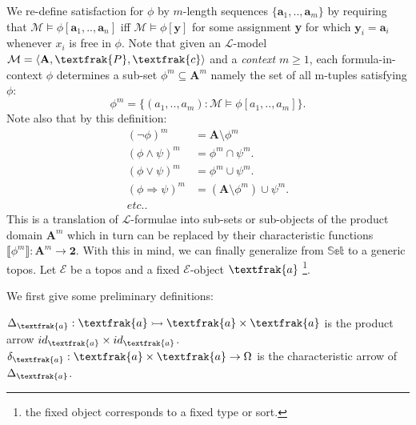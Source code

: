 We re-define satisfaction for $\phi$ by $m$-length sequences $\{ \textbf{a}_1,..,\textbf{a}_m \}$ by requiring that $\mathcal{M} \vDash \phi[\textbf{a}_1,..,\textbf{a}_n]$ iff $\mathcal{M} \vDash \phi[\textbf{y}]$ for some assignment \textbf{y} for which $\textbf{y}_i = \textbf{a}_i$ whenever $x_i$ is free in $\phi$.  \newline
Note that given an $\mathcal{L}$-model $\mathcal{M}= \langle \textbf{A}, \textfrak{P}, \textfrak{c} \rangle$ and a \emph{context} $m \geq 1$, each formula-in-context $\phi$ determines a sub-set $\phi^m \subseteq \textbf{A}^m$ namely the set of all m-tuples satisfying $\phi$:
\begin{equation*}
	\phi^m = \{(a_1,..,a_m) : \mathcal{M} \vDash \phi[a_1,..,a_m]\}.
\end{equation*}
Note also that by this definition:
\begin{align*} 
	(\neg \phi)^m &=  \textbf{A} \setminus \phi^m \\ 
	(\phi \land \psi)^m &=  \phi^m \cap \psi^m. \\
	(\phi \lor \psi)^m &=  \phi^m \cup \psi^m. \\
	(\phi \Rightarrow \psi)^m &=  (\textbf{A} \setminus \phi^m) \cup \psi^m. \\ etc..
\end{align*}
This is a translation of $\mathcal{L}$-formulae into sub-sets or sub-objects of the product domain $\textbf{A}^m$ which in turn can be replaced by their characteristic functions $\llbracket \phi^m \rrbracket : \textbf{A}^m \rightarrow \textbf{2}$. \newline
With this in mind, we can finally generalize from $\mathbb{Set}$ to a generic topos.
\newline
\newline
Let $\mathcal{E}$ be a topos and a fixed $\mathcal{E}$-object  $\textfrak{a}$ \footnote{the fixed object corresponds to a fixed type or sort.}.\newline

We first give some preliminary definitions:
\begin{definition}
	$\Delta_\textfrak{a} : \textfrak{a} \rightarrowtail \textfrak{a} \times \textfrak{a}$ is the product arrow $id_\textfrak{a} \times id_\textfrak{a}$.\newline
	$\delta_\textfrak{a} : \textfrak{a} \times \textfrak{a} \rightarrow \Omega$ is the characteristic arrow of $\Delta_\textfrak{a}$. 
\end{definition}

